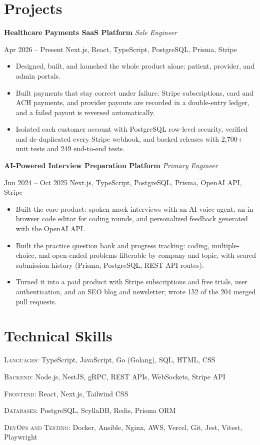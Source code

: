 \documentclass[letterpaper,11pt]{article}
\newcommand{\entry}[4]{%
  {\large\textbf{#1}} \textbar{} \textit{#2}\par
  {\small #3 \textbar{} #4}\par}
\newcommand{\skill}[2]{\textsc{#1:} #2\par\vspace{1.5pt}}
\begin{document}
\section{Projects}
\entry{Healthcare Payments SaaS Platform}{Sole Engineer}{Apr 2026 -- Present}{Next.js, React, TypeScript, PostgreSQL, Prisma, Stripe}
\begin{itemize}
  \item Designed, built, and launched the whole product alone: patient, provider, and admin portals.
  \item Built payments that stay correct under failure: Stripe subscriptions, card and ACH payments, and
        provider payouts are recorded in a double-entry ledger, and a failed payout is reversed automatically.
  \item Isolated each customer account with PostgreSQL row-level security, verified and de-duplicated every
        Stripe webhook, and backed releases with 2,700+ unit tests and 249 end-to-end tests.
\end{itemize}
\vspace{5pt}
\entry{AI-Powered Interview Preparation Platform}{Primary Engineer}{Jun 2024 -- Oct 2025}{Next.js, TypeScript, PostgreSQL, Prisma, OpenAI API, Stripe}
\begin{itemize}
  \item Built the core product: spoken mock interviews with an AI voice agent, an in-browser code editor for
        coding rounds, and personalized feedback generated with the OpenAI API.
  \item Built the practice question bank and progress tracking: coding, multiple-choice, and open-ended problems
        filterable by company and topic, with scored submission history (Prisma, PostgreSQL, REST API routes).
  \item Turned it into a paid product with Stripe subscriptions and free trials, user authentication, and an
        SEO blog and newsletter; wrote 152 of the 204 merged pull requests.
\end{itemize}

\section{Technical Skills}
\skill{Languages}{TypeScript, JavaScript, Go (Golang), SQL, HTML, CSS}
\skill{Backend}{Node.js, NestJS, gRPC, REST APIs, WebSockets, Stripe API}
\skill{Frontend}{React, Next.js, Tailwind CSS}
\skill{Databases}{PostgreSQL, ScyllaDB, Redis, Prisma ORM}
\skill{DevOps and Testing}{Docker, Ansible, Nginx, AWS, Vercel, Git, Jest, Vitest, Playwright}
\end{document}
